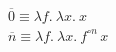 \documentclass{article}
\begin{document}
\begin{center}
	{\Large
		$\overline{0} \equiv \lambda f.\ \lambda x.\ x$\\[0.6em]
		$\overline{n} \equiv \lambda f.\ \lambda x.\ f^{\circ n}\, x$
	}
\end{center}
\end{document}
